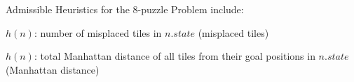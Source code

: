 \begin{example}
    Admissible Heuristics for the 8-puzzle Problem include:

    \begin{listu}
        \item $h(n)$: number of misplaced tiles in $n.state$ (misplaced tiles)
        \item $h(n)$: total Manhattan distance of all tiles from their goal positions in $n.state$ (Manhattan distance)
    \end{listu}
\end{example}
